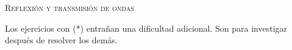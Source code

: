 \documentclass[11pt, spanish, a4paper, twopage]{article}
\begin{document}
\begin{center}
	\textsc{\LARGE Reflexión y transmisión de ondas}
\end{center}

Los ejercicios con (*) entrañan una dificultad adicional. Son para investigar después de resolver los demás.


\begin{enumerate}






\end{enumerate}
\end{document}
